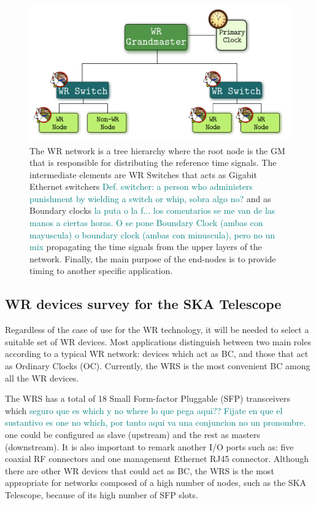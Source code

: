 \begin{figure}[H] \centering \includegraphics[scale=0.4]{img/wr_hierarchy}
	\caption{The WR network is a tree hierarchy where the root node is the
	GM that is responsible for distributing the reference time signals. The
	intermediate elements are WR Switches that acts as Gigabit Ethernet
	switchers \textcolor{teal}{Def. switcher: a person who administers 
	punishment by wielding a switch or whip, sobra algo no?} and as Boundary 
	clocks \textcolor{teal}{la puta o la f... los comentarios se me van de las 
	manos a ciertas horas. O se pone Boundary Clock (ambas con mayuscula) o 
	boundary clock (ambas con minuscula), pero no un mix} propagating the time 
	signals from the
	upper layers of the network. Finally, the main purpose of the end-nodes
	is to provide timing to another specific application.}
\label{fig:wr_hierarchy} \end{figure}

\subsection{WR devices survey for the SKA Telescope} \label{subsec:wr-dev}

Regardless of the case of use for the WR technology, it will be needed to select
a suitable set of WR devices. Most applications distinguish between two main roles
according to a typical WR network: devices which act as BC, and those that act as
Ordinary Clocks (OC). Currently, the WRS \cite{ohwr:wrs} is the most convenient
BC among all the WR devices. 

The WRS has a total of 18 Small Form-factor Pluggable (SFP) transceivers which 
\textcolor{teal}{seguro que es which y no where lo que pega aqui?? 
Fijate en que el sustantivo es one no which, por tanto aqui va una conjuncion 
no un pronombre.} 
one could be configured as slave
(upstream) and the rest as masters (downstream). It is also important to remark
another I/O ports such as: five coaxial RF connectors and one management
Ethernet RJ45 connector. Although there are other WR devices that could act as
BC, the WRS is the most appropriate for networks composed of a high number of nodes,
such as the SKA Telescope, because of its high number of SFP slots.

